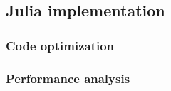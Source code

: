 

\subsection{Julia implementation}\label{sec:implementation}


\subsubsection{Code optimization}\label{sec:optimization}


\subsubsection{Performance analysis}\label{sec:analysis}


